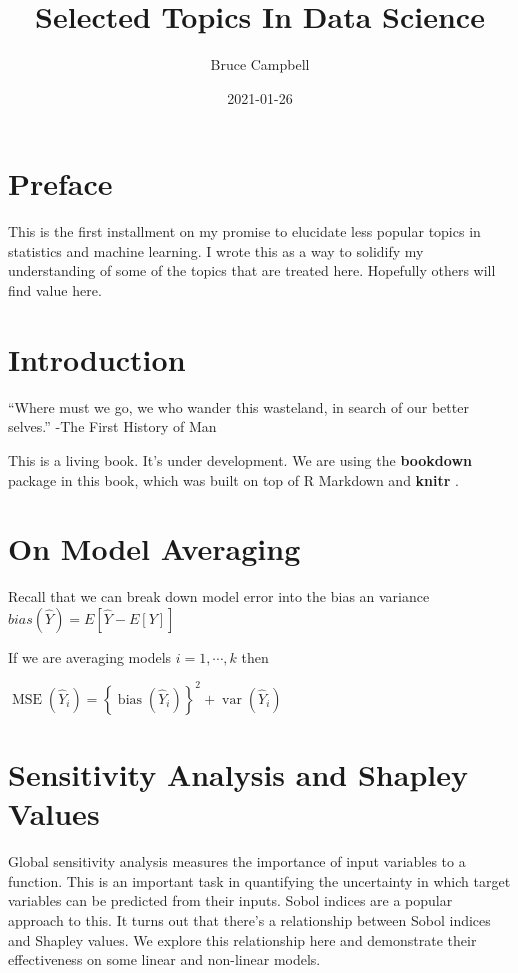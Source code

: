 \documentclass[
  11pt,
]{book}
\title{Selected Topics In Data Science}
\author{Bruce Campbell}
\date{2021-01-26}
\begin{document}
\maketitle

\hypertarget{preface}{%
\chapter{Preface}\label{preface}}

This is the first installment on my promise to elucidate less popular topics in statistics and machine learning. I wrote this as a way to solidify my understanding of some of the topics that are treated here. Hopefully others will find value here.

\hypertarget{intro}{%
\chapter{Introduction}\label{intro}}

``Where must we go, we who wander this wasteland, in search of our better selves.'' -The First History of Man

This is a living book. It's under development. We are using the \textbf{bookdown} package \citep{R-bookdown} in this book, which was built on top of R Markdown and \textbf{knitr} \citep{xie2015}.

\hypertarget{on-model-averaging}{%
\chapter{On Model Averaging}\label{on-model-averaging}}

Recall that we can break down model error into the bias an variance \(bias(\hat{Y})= E[\hat{Y}-E[Y]]\)

If we are averaging models \(i=1, \cdots ,k\) then

\(\operatorname{MSE}\left(\hat{Y}_{i}\right)=\left\{\operatorname{bias}\left(\hat{Y}_{i}\right)\right\}^{2}+\operatorname{var}\left(\hat{Y}_{i}\right)\)

\hypertarget{sensitivity-analysis-and-shapley-values}{%
\chapter{Sensitivity Analysis and Shapley Values}\label{sensitivity-analysis-and-shapley-values}}

Global sensitivity analysis measures the importance of input variables to a function. This is an important task in quantifying the uncertainty in which target variables can be predicted from their inputs. Sobol indices \citep{sobolindices} are a popular approach to this. It turns out that there's a relationship between Sobol indices and Shapley values. We explore this relationship here and demonstrate their effectiveness on some linear and non-linear models.
\end{document}
